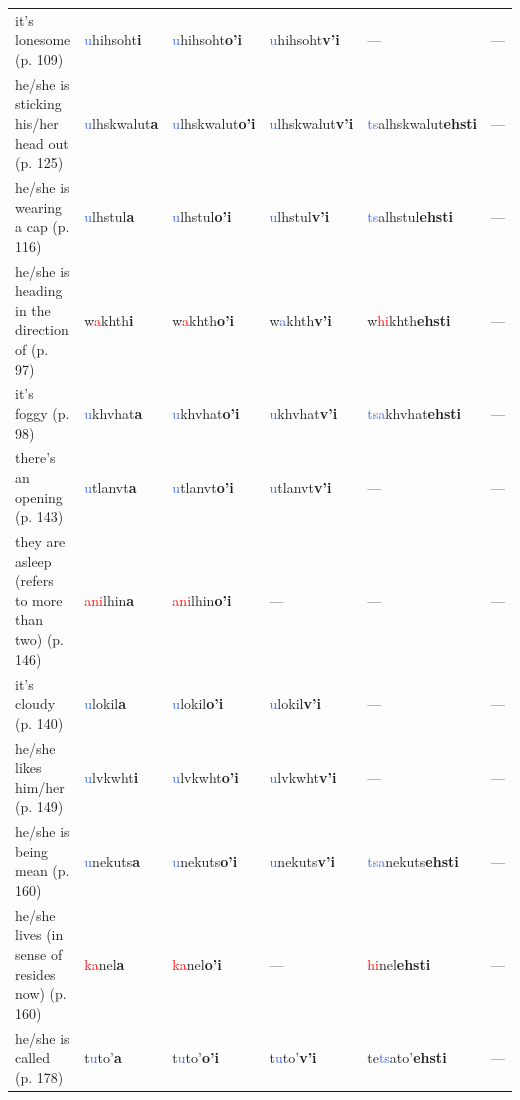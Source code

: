 \documentclass[oneside,openany]{book}%
\begin{document}
\begin{tabularx}{\textwidth}{>{\hsize=1.5\hsize\RaggedRight}X >{\hsize=0.9\hsize}X >{\hsize=0.9\hsize}X >{\hsize=0.9\hsize}X >{\hsize=0.9\hsize}X >{\hsize=0.9\hsize}X}
it's lonesome (p. 109)&\textcolor{RoyalBlue}{u}hihsoht\textbf{i}&\textcolor{RoyalBlue}{u}hihsoht\textbf{o'i}&\textcolor{RoyalBlue}{u}hihsoht\textbf{v'i}&---&---\\%
he/she is sticking his/her head out (p. 125)&\textcolor{RoyalBlue}{u}lhskwalut\textbf{a}&\textcolor{RoyalBlue}{u}lhskwalut\textbf{o'i}&\textcolor{RoyalBlue}{u}lhskwalut\textbf{v'i}&\textcolor{RoyalBlue}{ts}alhskwalut\textbf{ehsti}&---\\%
he/she is wearing a cap (p. 116)&\textcolor{RoyalBlue}{u}lhstul\textbf{a}&\textcolor{RoyalBlue}{u}lhstul\textbf{o'i}&\textcolor{RoyalBlue}{u}lhstul\textbf{v'i}&\textcolor{RoyalBlue}{ts}alhstul\textbf{ehsti}&---\\%
he/she is heading in the direction of (p. 97)&w\textcolor{Red}{a}khth\textbf{i}&w\textcolor{Red}{a}khth\textbf{o'i}&w\textcolor{RoyalBlue}{a}khth\textbf{v'i}&w\textcolor{Red}{hi}khth\textbf{ehsti}&---\\%
it's foggy (p. 98)&\textcolor{RoyalBlue}{u}khvhat\textbf{a}&\textcolor{RoyalBlue}{u}khvhat\textbf{o'i}&\textcolor{RoyalBlue}{u}khvhat\textbf{v'i}&\textcolor{RoyalBlue}{tsa}khvhat\textbf{ehsti}&---\\%
there's an opening (p. 143)&\textcolor{RoyalBlue}{u}tlanvt\textbf{a}&\textcolor{RoyalBlue}{u}tlanvt\textbf{o'i}&\textcolor{RoyalBlue}{u}tlanvt\textbf{v'i}&---&---\\%
they are asleep (refers to more than two) (p. 146)&\textcolor{Red}{ani}lhin\textbf{a}&\textcolor{Red}{ani}lhin\textbf{o'i}&---&---&---\\%
it's cloudy (p. 140)&\textcolor{RoyalBlue}{u}lokil\textbf{a}&\textcolor{RoyalBlue}{u}lokil\textbf{o'i}&\textcolor{RoyalBlue}{u}lokil\textbf{v'i}&---&---\\%
he/she likes him/her (p. 149)&\textcolor{RoyalBlue}{u}lvkwht\textbf{i}&\textcolor{RoyalBlue}{u}lvkwht\textbf{o'i}&\textcolor{RoyalBlue}{u}lvkwht\textbf{v'i}&---&---\\%
he/she is being mean (p. 160)&\textcolor{RoyalBlue}{u}nekuts\textbf{a}&\textcolor{RoyalBlue}{u}nekuts\textbf{o'i}&\textcolor{RoyalBlue}{u}nekuts\textbf{v'i}&\textcolor{RoyalBlue}{tsa}nekuts\textbf{ehsti}&---\\%
he/she lives (in sense of resides now) (p. 160)&\textcolor{Red}{ka}nel\textbf{a}&\textcolor{Red}{ka}nel\textbf{o'i}&---&\textcolor{Red}{hi}nel\textbf{ehsti}&---\\%
he/she is called (p. 178)&t\textcolor{RoyalBlue}{u}to'\textbf{a}&t\textcolor{RoyalBlue}{u}to'\textbf{o'i}&t\textcolor{RoyalBlue}{u}to'\textbf{v'i}&te\textcolor{RoyalBlue}{ts}ato'\textbf{ehsti}&---\\%

\end{tabularx}
\end{document}
